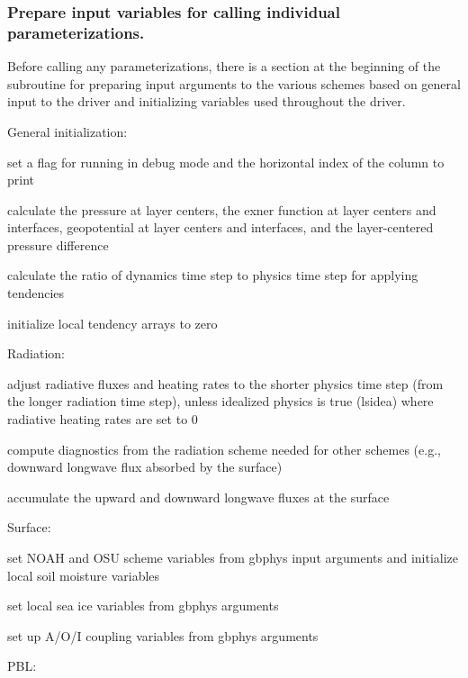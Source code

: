 \subsubsection*{Prepare input variables for calling individual parameterizations.}

Before calling any parameterizations, there is a section at the beginning of the subroutine for preparing input arguments to the various schemes based on general input to the driver and initializing variables used throughout the driver.
\begin{DoxyItemize}
\item General initialization\+:
\begin{DoxyItemize}
\item set a flag for running in debug mode and the horizontal index of the column to print
\item calculate the pressure at layer centers, the exner function at layer centers and interfaces, geopotential at layer centers and interfaces, and the layer-\/centered pressure difference
\item calculate the ratio of dynamics time step to physics time step for applying tendencies
\item initialize local tendency arrays to zero
\end{DoxyItemize}
\item Radiation\+:
\begin{DoxyItemize}
\item adjust radiative fluxes and heating rates to the shorter physics time step (from the longer radiation time step), unless idealized physics is true (lsidea) where radiative heating rates are set to 0
\item compute diagnostics from the radiation scheme needed for other schemes (e.\+g., downward longwave flux absorbed by the surface)
\item accumulate the upward and downward longwave fluxes at the surface
\end{DoxyItemize}
\item Surface\+:
\begin{DoxyItemize}
\item set N\+O\+AH and O\+SU scheme variables from gbphys input arguments and initialize local soil moisture variables
\item set local sea ice variables from gbphys arguments
\item set up A/\+O/I coupling variables from gbphys arguments
\end{DoxyItemize}
\item P\+BL\+:

\end{DoxyItemize}
